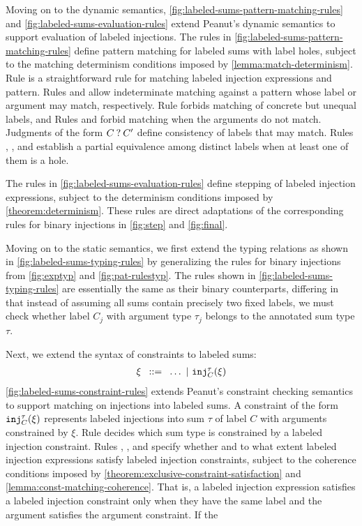 
Moving on to the dynamic semantics, \autoref{fig:labeled-sums-pattern-matching-rules} and \autoref{fig:labeled-sums-evaluation-rules}
extend Peanut's dynamic semantics to support evaluation of labeled injections.
The rules in \autoref{fig:labeled-sums-pattern-matching-rules} define pattern matching for labeled sums with label holes,
subject to the matching determinism conditions imposed by \autoref{lemma:match-determinism}.
Rule \MInj is a straightforward rule for matching labeled injection expressions and pattern.
Rules \MMInjTag and \MMInjArg allow indeterminate matching against a pattern whose label or argument may match, respectively.
Rule \NMInj forbids matching of concrete but unequal labels, and
Rules \NMInjTag and \NMInjArg forbid matching when the arguments do not match.
Judgments of the form $C \mathbin{?} C'$ define consistency of labels that may match.
Rules \TMMSym, \TMMHole, and \TMMEHole establish a partial equivalence among distinct labels when at least one of them is a hole.

The rules in \autoref{fig:labeled-sums-evaluation-rules} define stepping of labeled injection expressions,
subject to the determinism conditions imposed by \autoref{theorem:determinism}.
These rules are direct adaptations of the corresponding rules for binary injections in \autoref{fig:step} and \autoref{fig:final}.



Moving on to the static semantics, we first extend the typing relations as shown in \autoref{fig:labeled-sums-typing-rules}
by generalizing the rules for binary injections from \autoref{fig:exptyp} and \autoref{fig:pat-rulestyp}.
The rules shown in \autoref{fig:labeled-sums-typing-rules} are essentially the same as their binary counterparts,
differing in that instead of assuming all sums contain precisely two fixed labels,
we must check whether label $C_j$ with argument type $\tau_j$ belongs to the annotated sum type $\tau$.


Next, we extend the syntax of constraints to labeled sums:
\[
  \arraycolsep=4pt\begin{array}{lll}
    \xi & ::= & \ldots ~\vert~ \cinj{C}{\tau}{\xi}
  \end{array}
\]
\autoref{fig:labeled-sums-constraint-rules} extends Peanut's constraint checking semantics to support matching on injections into labeled sums.
A constraint of the form $\mathtt{inj}_{C}^{\tau}(\xi)$ represents labeled injections into sum $\tau$ of label $C$ with arguments constrained by $\xi$.
Rule \CTInj decides which sum type is constrained by a labeled injection constraint.
Rules \CSInj, \CMSInjTag, and \CMSInjArg specify whether and to what extent labeled injection expressions satisfy labeled injection constraints,
subject to the coherence conditions imposed by \autoref{theorem:exclusive-constraint-satisfaction} and \autoref{lemma:const-matching-coherence}.
That is, a labeled injection expression satisfies a labeled injection constraint
only when they have the same label and the argument satisfies the argument constraint.
If the 

